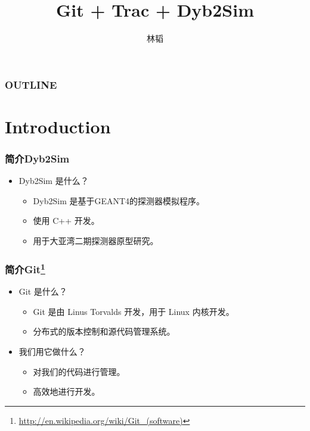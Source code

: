 \documentclass[20pt]{beamer}
\begin{document}
\title{Git + Trac + Dyb2Sim}
\author{
    \texorpdfstring{林韬
                    \newline
                    \href{mailto:lintao@ihep.ac.cn}
                    {\footnotesize{}}}
                    {Lin Tao}
}


\maketitle

\begin{frame}
    \frametitle{OUTLINE}
    \tableofcontents
\end{frame}


\section{Introduction}

\begin{frame}
    \frametitle{简介Dyb2Sim}
    \begin{itemize}    
        \item Dyb2Sim 是什么？
            \begin{itemize}    
                \item Dyb2Sim 是基于GEANT4的探测器模拟程序。
                \item 使用 C++ 开发。
                \item 用于大亚湾二期探测器原型研究。
            \end{itemize}
    \end{itemize}
\end{frame}

\begin{frame}
    \frametitle{简介Git\footnote{\url{http://en.wikipedia.org/wiki/Git\_(software)}}}
    \begin{itemize}    
        \item Git 是什么？
            \begin{itemize}
                \item Git 是由 Linus Torvalds 开发，用于 Linux 内核开发。
                \item 分布式的版本控制和源代码管理系统。
            \end{itemize}
        \item 我们用它做什么？
            \begin{itemize}
                \item 对我们的代码进行管理。
                \item 高效地进行开发。
            \end{itemize}
    \end{itemize}
\end{frame}
\end{document}

